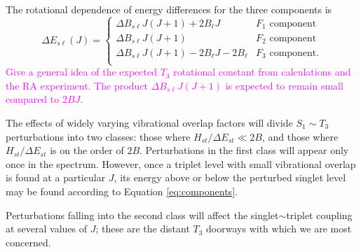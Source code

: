 \documentclass[12pt]{mitthesis}
\newcommand{\POINT}[1]{\textcolor{magenta}{#1}}
\begin{document}
The rotational dependence of energy differences for the three
components is
\begin{equation}
  \label{eq:components}
  \Delta E_{s\ell}(J) = 
  \begin{cases}
    \Delta B_{s\ell}J(J+1) + 2B_{\ell}J           
    & F_1 \text{ component}\\
    \Delta B_{s\ell}J(J+1)                      
    & F_2 \text{ component}\\
    \Delta B_{s\ell}J(J+1) - 2B_{\ell}J - 2B_{\ell} 
    & F_3 \text{ component}.\\
  \end{cases}
\end{equation}
\POINT{Give a general idea of the expected $T_3$ rotational constant
  from calculations and the RA experiment.  The product $\Delta
  B_{s\ell}J(J+1)$ is expected to remain small compared to $2BJ$.}

The effects of widely varying vibrational overlap factors will divide
$S_1 \sim T_3$ perturbations into two classes: those where
$H_{st}/\Delta E_{st} \ll 2B$, and those where $H_{st} / \Delta
E_{st}$ is on the order of $2B$.  Perturbations in the first class
will appear only once in the spectrum.  However, once a triplet level
with small vibrational overlap is found at a particular $J$, its
energy above or below the perturbed singlet level may be found
according to Equation \ref{eq:components}.

Perturbations falling into the second class will affect the
singlet$\sim$triplet coupling at several values of $J$; these are the
distant $T_3$ doorways with which we are most concerned.

\end{document}
